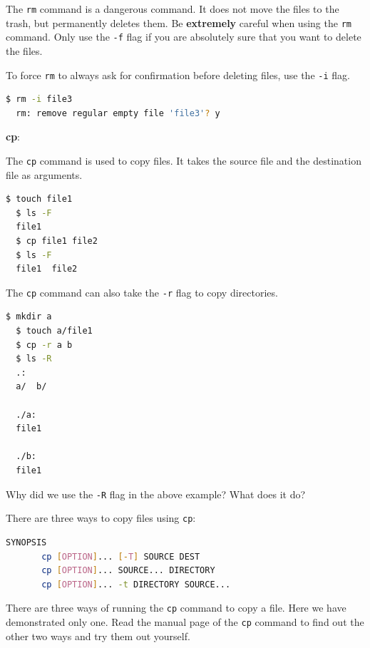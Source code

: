 \begin{warn}
  The \texttt{rm} command is a dangerous command.
  It does not move the files to the trash, but permanently deletes them.
  Be \textbf{extremely} careful when using the \texttt{rm} command.
  Only use the \texttt{-f} flag if you are absolutely sure that you want to delete the files.
\end{warn}

To force \texttt{rm} to always ask for confirmation before deleting files, use the \texttt{-i} flag.

\begin{lstlisting}[language=bash]
  $ rm -i file3
  rm: remove regular empty file 'file3'? y
\end{lstlisting}

\textbf{cp}:

The \texttt{cp} command is used to copy files.
It takes the source file and the destination file as arguments.

\begin{lstlisting}[language=bash]
  $ touch file1
  $ ls -F
  file1
  $ cp file1 file2
  $ ls -F
  file1  file2
\end{lstlisting}

The \texttt{cp} command can also take the \texttt{-r} flag to copy directories.

\begin{lstlisting}[language=bash]
  $ mkdir a
  $ touch a/file1
  $ cp -r a b
  $ ls -R
  .:
  a/  b/

  ./a:
  file1

  ./b:
  file1
\end{lstlisting}

\begin{exercise}
  Why did we use the \texttt{-R} flag in the above example? What does it do?
\end{exercise}

There are three ways to copy files using \texttt{cp}:

\begin{lstlisting}[language=bash]
SYNOPSIS
       cp [OPTION]... [-T] SOURCE DEST
       cp [OPTION]... SOURCE... DIRECTORY
       cp [OPTION]... -t DIRECTORY SOURCE...
\end{lstlisting}

\begin{exercise}
  There are three ways of running the \texttt{cp} command to copy a file.
  Here we have demonstrated only one.
  Read the manual page of the \texttt{cp} command to find out the other two ways and try them out yourself.
\end{exercise}


